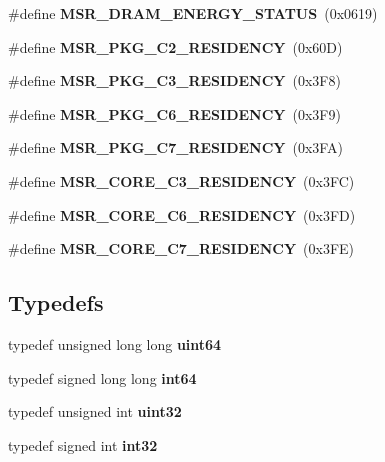 \begin{DoxyCompactItemize}
\item 
\#define {\bfseries M\+S\+R\+\_\+\+D\+R\+A\+M\+\_\+\+E\+N\+E\+R\+G\+Y\+\_\+\+S\+T\+A\+T\+US}~(0x0619)\label{types_8h_a26933b2c6904d22e9964f3f12c730fc8}

\item 
\#define {\bfseries M\+S\+R\+\_\+\+P\+K\+G\+\_\+\+C2\+\_\+\+R\+E\+S\+I\+D\+E\+N\+CY}~(0x60\+D)\label{types_8h_a82b97c2b35585f2293a7aa66839f472a}

\item 
\#define {\bfseries M\+S\+R\+\_\+\+P\+K\+G\+\_\+\+C3\+\_\+\+R\+E\+S\+I\+D\+E\+N\+CY}~(0x3\+F8)\label{types_8h_a6c046e593954087b70981b8169b470f9}

\item 
\#define {\bfseries M\+S\+R\+\_\+\+P\+K\+G\+\_\+\+C6\+\_\+\+R\+E\+S\+I\+D\+E\+N\+CY}~(0x3\+F9)\label{types_8h_a7b1860de9867ad4e3c29bd2e240686b4}

\item 
\#define {\bfseries M\+S\+R\+\_\+\+P\+K\+G\+\_\+\+C7\+\_\+\+R\+E\+S\+I\+D\+E\+N\+CY}~(0x3\+F\+A)\label{types_8h_ae5f3968ee1644c8e11ed55463378b5a1}

\item 
\#define {\bfseries M\+S\+R\+\_\+\+C\+O\+R\+E\+\_\+\+C3\+\_\+\+R\+E\+S\+I\+D\+E\+N\+CY}~(0x3\+F\+C)\label{types_8h_a0ebfd4e08ba05ea086c2b62a65962800}

\item 
\#define {\bfseries M\+S\+R\+\_\+\+C\+O\+R\+E\+\_\+\+C6\+\_\+\+R\+E\+S\+I\+D\+E\+N\+CY}~(0x3\+F\+D)\label{types_8h_a469d53b8d39927c4789bdb2ed12dcd8c}

\item 
\#define {\bfseries M\+S\+R\+\_\+\+C\+O\+R\+E\+\_\+\+C7\+\_\+\+R\+E\+S\+I\+D\+E\+N\+CY}~(0x3\+F\+E)\label{types_8h_aa809d05086aa9345a20960e502e4935d}

\end{DoxyCompactItemize}
\subsection*{Typedefs}
\begin{DoxyCompactItemize}
\item 
typedef unsigned long long {\bfseries uint64}\label{types_8h_a29940ae63ec06c9998bba873e25407ad}

\item 
typedef signed long long {\bfseries int64}\label{types_8h_a87dc1c46a17e3ee6037afdb6aef76632}

\item 
typedef unsigned int {\bfseries uint32}\label{types_8h_a1134b580f8da4de94ca6b1de4d37975e}

\item 
typedef signed int {\bfseries int32}\label{types_8h_a43d43196463bde49cb067f5c20ab8481}

\end{DoxyCompactItemize}

